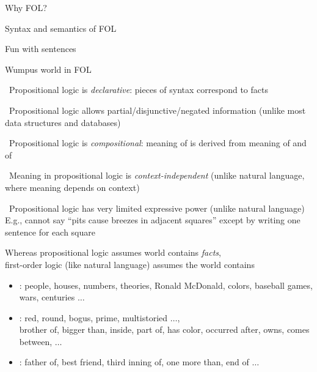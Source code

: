 \documentclass{article}
\begin{document}
\begin{huge}

\sf


\blob Why FOL?

\blob Syntax and semantics of FOL

\blob Fun with sentences

\blob Wumpus world in FOL



\smiley\ Propositional logic is \emph{declarative}: pieces of syntax correspond to facts

\smiley\ Propositional logic allows partial/disjunctive/negated information\al
  (unlike most data structures and databases)

\smiley\ Propositional logic is \emph{compositional}: \al
  meaning of  is derived from meaning of  and of 

\smiley\ Meaning in propositional logic is \emph{context-independent}\al
  (unlike natural language, where meaning depends on context)

\frowny\ Propositional logic has very limited expressive power\al
  (unlike natural language)\al
  E.g., cannot say ``pits cause breezes in adjacent squares''\nl
    except by writing one sentence for each square


Whereas propositional logic assumes world contains \emph{facts},\\
first-order logic (like natural language) assumes the world contains
\begin{itemize} 
\item {}: people, houses, numbers, theories,
Ronald McDonald, colors, baseball games, wars, centuries $\ldots$ 
\item {}: red, round, bogus, prime, multistoried $\ldots$, \\
brother of, bigger than, inside, part of, has color, occurred after, owns, comes between, $\ldots$
\item {}: father of, best friend, third inning of, one more
than, end of $\ldots$
\end{itemize}


\end{huge}
\end{document}
